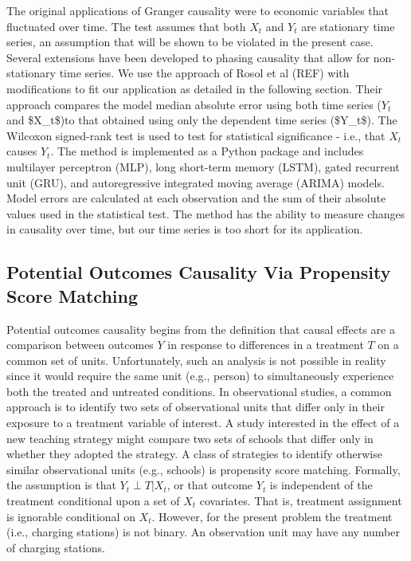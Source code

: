 \documentclass[
  letterpaper,
  DIV=11,
  numbers=noendperiod]{scrartcl}
\begin{document}
The original applications of Granger causality were to economic
variables that fluctuated over time. The test assumes that both \(X_t\)
and \(Y_t\) are stationary time series, an assumption that will be shown
to be violated in the present case. Several extensions have been
developed to phasing causality that allow for non-stationary time
series. We use the approach of Rosol et al (REF) with modifications to
fit our application as detailed in the following section. Their approach
compares the model median absolute error using both time series (\(Y_t\)
and \$X\_t\$)to that obtained using only the dependent time series
(\$Y\_t\$). The Wilcoxon signed-rank test is used to test for
statistical significance - i.e., that \(X_t\) causes \(Y_t\). The method
is implemented as a Python package and includes multilayer perceptron
(MLP), long short-term memory (LSTM), gated recurrent unit (GRU), and
autoregressive integrated moving average (ARIMA) models. Model errors
are calculated at each observation and the sum of their absolute values
used in the statistical test. The method has the ability to measure
changes in causality over time, but our time series is too short for its
application.

\hypertarget{potential-outcomes-causality-via-propensity-score-matching}{%
\subsection{Potential Outcomes Causality Via Propensity Score
Matching}\label{potential-outcomes-causality-via-propensity-score-matching}}

Potential outcomes causality begins from the definition that causal
effects are a comparison between outcomes \(Y\) in response to
differences in a treatment \(T\) on a common set of units.
Unfortunately, such an analysis is not possible in reality since it
would require the same unit (e.g., person) to simultaneously experience
both the treated and untreated conditions. In observational studies, a
common approach is to identify two sets of observational units that
differ only in their exposure to a treatment variable of interest. A
study interested in the effect of a new teaching strategy might compare
two sets of schools that differ only in whether they adopted the
strategy. A class of strategies to identify otherwise similar
observational units (e.g., schools) is propensity score matching.
Formally, the assumption is that \(Y_t \perp T|X_t\), or that outcome
\(Y_t\) is independent of the treatment conditional upon a set of
\(X_t\) covariates. That is, treatment assignment is ignorable
conditional on \(X_t\). However, for the present problem the treatment
(i.e., charging stations) is not binary. An observation unit may have
any number of charging stations.
\end{document}
